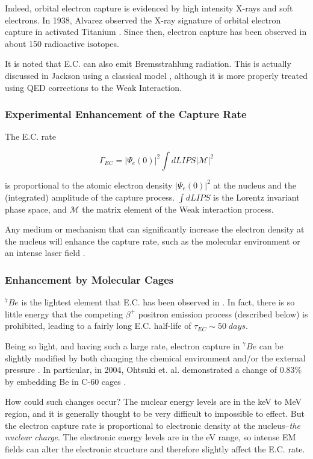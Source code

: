 \documentclass[%
 aip,
 jmp,%
 amsmath,amssymb,
 reprint,%
]{revtex4-1}
\begin{document}
Indeed, orbital electron capture is evidenced by high intensity X-rays and soft electrons.  In 1938, Alvarez observed the X-ray signature of orbital electron capture in activated Titanium \cite{alvarez}. Since then, electron capture has been observed in about 150 radioactive isotopes.

It is noted that E.C. can also emit Bremsstrahlung radiation.  This is actually discussed in Jackson using a classical model \cite{jackson}, although it is more properly treated using QED corrections to the Weak Interaction\cite{Jauch}.  

\subsubsection{Experimental Enhancement of the Capture Rate}

The E.C. rate 

$$\Gamma_{EC}=\big\vert\Psi_{e}(0)\big\vert^{2}\int dLIPS\big\vert\mathcal{M}\big\vert^{2}$$

is proportional to the atomic electron density  $\big\vert\Psi_{e}(0)\big\vert^{2}$  at the nucleus and the (integrated) amplitude of the capture process.
$\int dLIPS$ is the Lorentz invariant phase space,  and $\mathcal{M}$  the matrix element of the Weak interaction process.

Any medium or mechanism that can significantly increase the electron density at the nucleus will enhance the capture rate, such as the molecular environment \cite{ohtsuki} or an intense laser field \cite{sato}.

\subsubsection{Enhancement by Molecular Cages}

$^{7}Be$ is the  lightest element that E.C. has been observed in \cite{radbookbahcall}. In fact, there is so little energy that the competing $\beta^{+}$ positron emission process (described below) is prohibited, leading to a fairly long E.C. half-life of $\tau_{EC}\sim 50\;days$.

Being so light, and having such a large rate, electron capture in $^{7}Be$ can be slightly modified by both changing the chemical environment and/or the external pressure \cite{wang,raydas,ohtsuki}. In particular, in 2004, Ohtsuki et. al. demonstrated a change of $0.83\%$  by embedding Be in C-60 cages \cite{ohtsuki}.

How could such changes occur?  The nuclear energy levels are in the keV to MeV region, and it is generally thought to be very difficult to impossible to effect.  But the electron capture rate is proportional to electronic density at the nucleus--\emph{the nuclear charge}.   The electronic energy levels are in the eV range, so intense EM fields can alter the electronic structure and therefore slightly affect the E.C. rate. 
\end{document}
